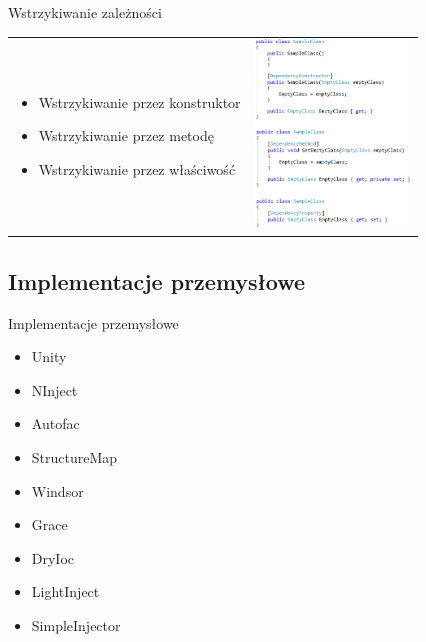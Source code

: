 \documentclass{beamer}
\begin{document}
\begin{frame}{Wstrzykiwanie zależności}
\begin{table}
     \begin{small}
	\begin{tabular}{ p{7cm} p{3cm} }
	
	\begin{minipage}{.6\textwidth}
\begin{itemize}
	\item Wstrzykiwanie przez konstruktor
	\item Wstrzykiwanie przez metodę
	\item Wstrzykiwanie przez właściwość
\end{itemize}
   	 \end{minipage}
   	 &   	 
	\begin{minipage}{.3\textwidth}	
  		\includegraphics[height=5cm]{PresentationDependency.png}
   	 \end{minipage}

	\end{tabular}
     \end{small}
\end{table}
\end{frame}

\subsection*{Implementacje przemysłowe}

\begin{frame}{Implementacje przemysłowe}
\begin{itemize}
	\item Unity
	\item NInject
	\item Autofac
	\item StructureMap
	\item Windsor
	\item Grace
	\item DryIoc
	\item LightInject
	\item SimpleInjector
\end{itemize}
\end{frame}
\end{document}
